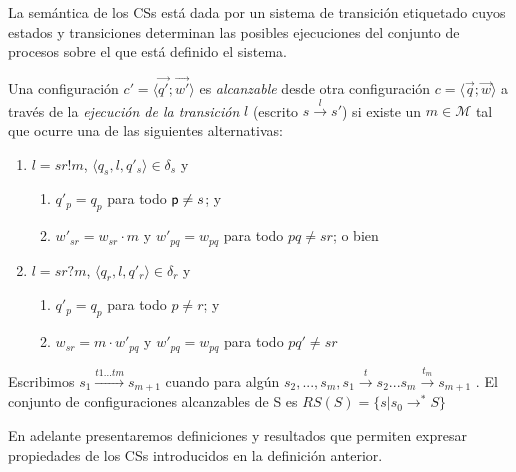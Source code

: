 La semántica de los CSs está dada por un sistema de transición etiquetado cuyos estados y transiciones determinan las posibles ejecuciones del conjunto de procesos sobre el que está definido el sistema.


\begin{definition}
\label{def:estadosyconf}
  Una configuración $c' = \langle \overrightarrow{q'} ; \overrightarrow{w'} \rangle$ es \emph{alcanzable} desde otra
  configuración $c = \langle \overrightarrow{q} ; \overrightarrow{w} \rangle$ a través de la \emph{ejecución de la transición} $l$ (escrito $s \overset{l}{\rightarrow} s'$) si existe un $m \in \mathcal{M}$ tal que ocurre una de las siguientes alternativas:
	\begin{enumerate}
		\item $l = sr!m$, $\langle q_s, l,  q'_s\rangle \in \delta_s$ y 
			\begin{enumerate}
				\item $q'_p = q_p$ para todo $\mathsf{p} \neq s$; y
				\item $w'_{sr} = w_{sr} \cdot m$ y  $w'_{pq} = w_{pq}$ para todo $pq \neq sr$; o bien
			\end{enumerate}
		\item $l = sr?m$, $\langle q_r, l,  q'_r\rangle \in \delta_r$ y 
			\begin{enumerate}
			\item $q'_{p} = q_{p}$ para todo $p \neq r$; y
				\item $w_{sr} = m \cdot w'_{pq}$ y $w'_{pq} = w_{pq}$ para todo $pq' \neq sr$
			\end{enumerate}
	\end{enumerate}
Escribimos $ s_1 \overset{t1...tm}{\rightarrow} s_{m+1}$ cuando para algún $s_2,...,s_m, s_1\overset{t}{\rightarrow} s_2...s_m\overset{t_m}{\rightarrow} s_{m+1} $ . El conjunto de configuraciones alcanzables de S es $RS(S) = \{s | s_0 \rightarrow^*S \}$
\end{definition}

En adelante presentaremos definiciones y resultados que permiten expresar propiedades de los CSs introducidos en la definición anterior.

